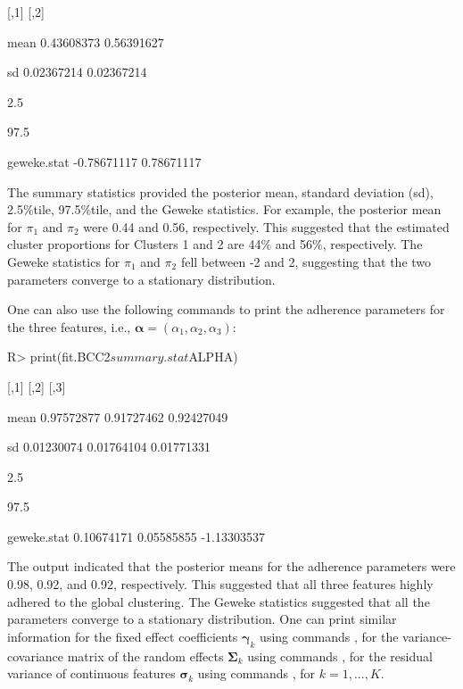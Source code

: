\begin{example}

                   [,1]       [,2]

mean         0.43608373 0.56391627

sd           0.02367214 0.02367214

2.5%

97.5%

geweke.stat -0.78671117 0.78671117

\end{example}

The summary statistics provided the posterior mean, standard deviation (sd), 2.5\%tile, 97.5\%tile, and the Geweke statistics. For example, the posterior mean for $\pi_1$ and $\pi_2$ were 0.44 and 0.56, respectively. This suggested that the estimated cluster proportions for Clusters 1 and 2 are 44\% and 56\%, respectively. The Geweke statistics for $\pi_1$ and $\pi_2$ fell between -2 and 2, suggesting that the two parameters converge to a stationary distribution. 

One can also use the following commands to print the adherence parameters for the three features, i.e., $\boldsymbol{\alpha}=(\alpha_1,\alpha_2,\alpha_3)$:

\begin{example}

R> print(fit.BCC2$summary.stat$ALPHA)

\end{example} 

\begin{example}

                  [,1]       [,2]        [,3]

mean        0.97572877 0.91727462  0.92427049

sd          0.01230074 0.01764104  0.01771331

2.5%

97.5%

geweke.stat 0.10674171 0.05585855 -1.13303537

\end{example}

The output indicated that the posterior means for the adherence parameters were 0.98, 0.92, and 0.92, respectively. This suggested that all three features highly adhered to the global clustering. The Geweke statistics suggested that all the parameters converge to a stationary distribution. One can print similar information for the fixed effect coefficients $\boldsymbol{\gamma}_k$ using commands , for the variance-covariance matrix of the random effects $\boldsymbol{\Sigma}_k$ using commands , for the residual variance of continuous features $\boldsymbol{\sigma}_k$ using commands , for $k=1,...,K$. 

